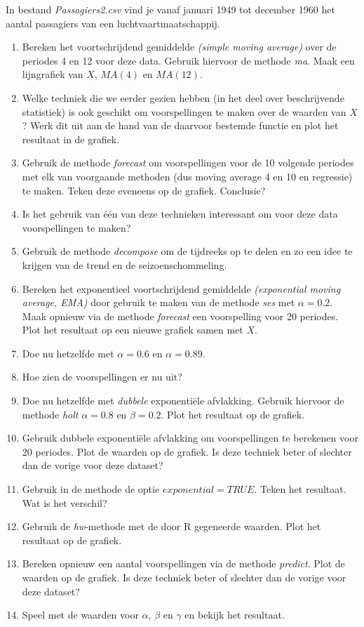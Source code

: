 \begin{exercise}
	In bestand \emph{Passagiers2.csv} vind je vanaf januari 1949 tot december 1960 het aantal passagiers van een luchtvaartmaatschappij. 
	\begin{enumerate}
		\item Bereken het voortschrijdend gemiddelde \emph{(simple moving average)} over de periodes 4 en 12 voor deze data. Gebruik hiervoor de methode \emph{ma}. Maak een lijngrafiek van $X$, $MA(4)$ en $MA(12)$.
		\item Welke techniek die we eerder gezien hebben (in het deel over beschrijvende statistiek) is ook geschikt om voorspellingen te maken over de waarden van $X$? Werk dit uit aan de hand van de daarvoor bestemde functie en plot het resultaat in de grafiek.
		\item Gebruik de methode \emph{forecast} om voorspellingen voor de 10 volgende periodes met elk van voorgaande methoden (dus moving average 4 en 10 en regressie) te maken. Teken deze eveneens op de grafiek. Conclusie?
			\item Is het gebruik van één van deze technieken interessant om voor deze data voorspellingen te maken? 
		\item Gebruik de methode \emph{decompose} om de tijdreeks op te delen en zo een idee te krijgen van de trend en de seizoenschommeling.
			\item Bereken het exponentieel voortschrijdend gemiddelde \emph{(exponential moving average, EMA)} door gebruik te maken van de methode \emph{ses} met $\alpha=0.2$. Maak opnieuw via de methode \emph{forecast} een voorspelling voor 20 periodes. Plot het resultaat op een nieuwe grafiek samen met $X$.
		\item Doe nu hetzelfde met $\alpha=0.6$ en $\alpha=0.89$. 
		\item Hoe zien de voorspellingen er nu uit?
			\item Doe nu hetzelfde met \emph{dubbele} exponentiële afvlakking. Gebruik hiervoor de methode \emph{holt}  $\alpha =  0.8$ en $\beta = 0.2$. Plot het resultaat op de grafiek.
		\item Gebruik dubbele exponentiële afvlakking om voorspellingen te berekenen voor 20 periodes. Plot de waarden op de grafiek. Is deze techniek beter of slechter dan de vorige voor deze dataset?
		\item Gebruik in de methode de optie $exponential=TRUE$. Teken het resultaat.  Wat is het verschil?
			\item Gebruik de \emph{hw}-methode met de door R gegeneerde waarden. Plot het resultaat op de grafiek.
		\item Bereken opnieuw een aantal voorspellingen via de methode \emph{predict}. Plot de waarden op de grafiek. Is deze techniek beter of slechter dan de vorige voor deze dataset?
		\item Speel met de waarden voor $\alpha$, $\beta$ en $\gamma$ en bekijk het resultaat.
	\end{enumerate}
	
\end{exercise}	

\begin{exercise}
	
\end{exercise}